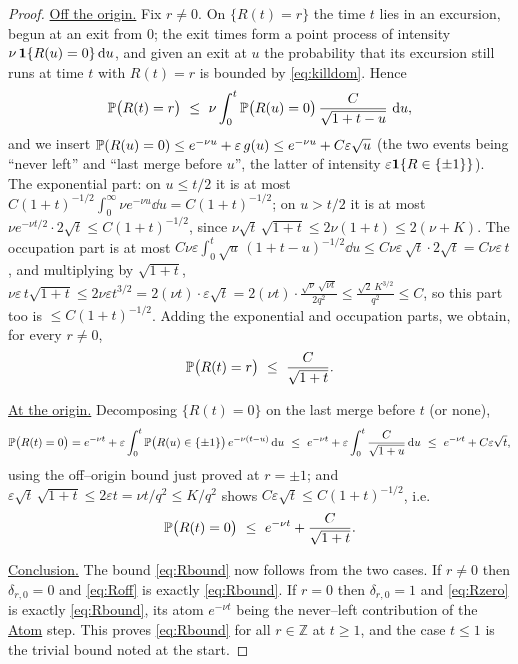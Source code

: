 \documentclass[11pt]{article}
\theoremstyle{plain}
\theoremstyle{definition}
\theoremstyle{remark}
\newcommand{\Z}{\mathbb{Z}}\newcommand{\R}{\mathbb{R}}\newcommand{\N}{\mathbb{N}}
\newcommand{\eps}{\varepsilon}\newcommand{\Exp}{\mathrm{Exp}}
\begin{document}
\begin{proof}
\underline{Off the origin.} Fix $r\ne0$. On $\{R(t)=r\}$ the time $t$ lies in an excursion,
begun at an exit from $0$; the exit times form a point process of intensity
$\nu\,\mathbf 1\{R(u)=0\}\,\mathrm{d} u$, and given an exit at $u$ the probability that its
excursion still runs at time $t$ with $R(t)=r$ is bounded by \eqref{eq:killdom}.
Hence
\[
  \PP\big(R(t)=r\big)\ \le\ \nu\int_0^t\PP\big(R(u)=0\big)\,
  \frac{C}{\sqrt{1+t-u}}\,\dd u,
\]
and we insert $\PP(R(u)=0)\le e^{-\nu u}+\eps\,g(u)\le e^{-\nu u}+C\eps\sqrt u$ (the
two events being ``never left'' and ``last merge before $u$'', the latter of
intensity $\eps\bone\{R\in\{\pm1\}\}$). The exponential part: on $u\le t/2$ it is at
most $C(1+t)^{-1/2}\int_0^\infty\nu e^{-\nu u}\dd u=C(1+t)^{-1/2}$; on $u>t/2$ it is
at most $\nu e^{-\nu t/2}\cdot2\sqrt t\le C(1+t)^{-1/2}$, since
$\nu\sqrt t\,\sqrt{1+t}\le2\nu(1+t)\le2(\nu+K)$. The occupation part is at most
$C\nu\eps\int_0^t\sqrt u\,(1+t-u)^{-1/2}\dd u\le C\nu\eps\,\sqrt t\cdot2\sqrt t
=C\nu\eps\,t$, and multiplying by $\sqrt{1+t}$,
$\nu\eps\,t\sqrt{1+t}\le2\nu\eps t^{3/2}=2(\nu t)\cdot\eps\sqrt t
=2(\nu t)\cdot\frac{\sqrt\nu\,\sqrt{\nu t}}{2q^2}\le\frac{\sqrt2\,K^{3/2}}{q^2}\le C$,
so this part too is $\le C(1+t)^{-1/2}$. Adding the exponential and occupation parts,
we obtain, for every $r\ne0$,
\begin{equation}\label{eq:Roff}
  \mathbb{P}\big(R(t)=r\big)\ \le\ \frac{C}{\sqrt{1+t}}.
\end{equation}

\underline{At the origin.} Decomposing $\{R(t)=0\}$ on the last merge before $t$ (or none),
\[
  \PP\big(R(t)=0\big)=e^{-\nu t}
  +\eps\int_0^t\PP\big(R(u)\in\{\pm1\}\big)\,e^{-\nu(t-u)}\dd u
  \ \le\ e^{-\nu t}+\eps\int_0^t\frac{C}{\sqrt{1+u}}\dd u
  \ \le\ e^{-\nu t}+C\eps\sqrt t,
\]
using the off--origin bound just proved at $r=\pm1$; and
$\eps\sqrt t\,\sqrt{1+t}\le2\eps t=\nu t/q^2\le K/q^2$ shows
$C\eps\sqrt t\le C(1+t)^{-1/2}$, i.e.
\begin{equation}\label{eq:Rzero}
  \mathbb{P}\big(R(t)=0\big)\ \le\ e^{-\nu t}+\frac{C}{\sqrt{1+t}}.
\end{equation}

\underline{Conclusion.} The bound \eqref{eq:Rbound} now follows from the two cases. If
$r\ne0$ then $\delta_{r,0}=0$ and \eqref{eq:Roff} is exactly \eqref{eq:Rbound}. If
$r=0$ then $\delta_{r,0}=1$ and
\eqref{eq:Rzero} is exactly \eqref{eq:Rbound}, its atom $e^{-\nu t}$ being the
never--left contribution of the \underline{Atom} step. This proves \eqref{eq:Rbound}
for all $r\in\Z$ at $t\ge1$, and the case $t\le1$ is the trivial bound noted at the
start.
\end{proof}
\end{document}
